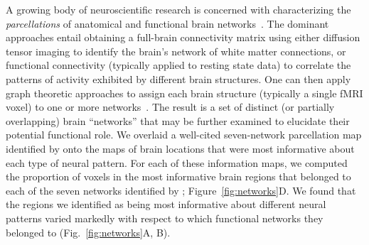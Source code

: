 \documentclass[11pt]{article}
\begin{document}
A growing body of neuroscientific research is concerned with characterizing the
\textit{parcellations} of anatomical and functional brain networks~\citep[for
review see][]{ZaleEtal10, ArslEtal18}. The dominant approaches entail obtaining
a full-brain connectivity matrix using either diffusion tensor imaging to
identify the brain's network of white matter connections, or functional
connectivity (typically applied to resting state data) to correlate the patterns
of activity exhibited by different brain structures.  One can then apply graph
theoretic approaches to assign each brain structure (typically a single fMRI
voxel) to one or more networks~\citep[for review see][]{BullSpor09}. The result
is a set of distinct (or partially overlapping) brain ``networks'' that may be
further examined to elucidate their potential functional role.  We overlaid a
well-cited seven-network parcellation map identified by \cite{YeoEtal11} onto
the maps of brain locations that were most informative about each type of neural
pattern.  For each of these information maps, we computed the proportion of
voxels in the most informative brain regions that belonged to each of the seven
networks identified by \cite{YeoEtal11}; Figure~\ref{fig:networks}D. We found
that the regions we identified as being most informative about different neural
patterns varied markedly with respect to which functional networks they belonged
to (Fig.~\ref{fig:networks}A, B).
\end{document}
